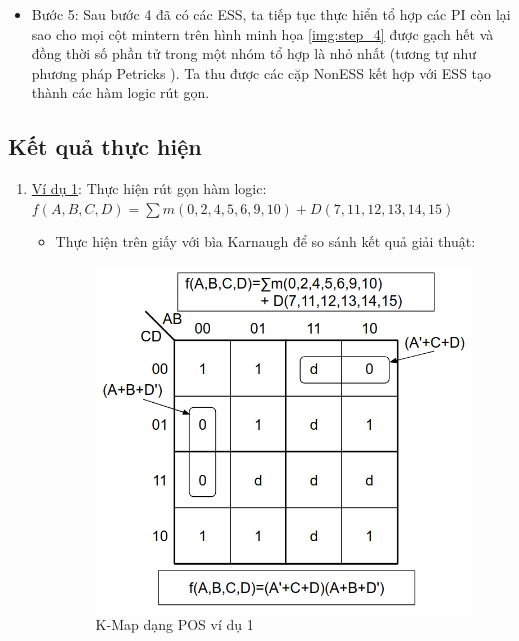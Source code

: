 \documentclass[titlepage]{article} %
\begin{document}
\begin{itemize}
    \item Bước 5: Sau bước 4 đã có các ESS, ta tiếp tục thực hiển tổ hợp các PI còn lại sao cho mọi cột mintern trên hình minh họa \ref{img:step_4} được gạch hết và đồng thời số phần tử trong một nhóm tổ hợp là nhỏ nhất (tương tự như phương pháp Petricks \cite{Petrick:2020}). Ta thu được các cặp NonESS kết hợp với ESS tạo thành các hàm logic rút gọn.
    
    
\end{itemize}


\subsection{Kết quả thực hiện}
\begin{enumerate}
    \item \underline{Ví dụ 1}: Thực hiện rút gọn hàm logic: \\   
    $f(A,B,C,D) = \sum m(0,2,4,5,6,9,10) + D(7,11,12,13,14,15)$
    \begin{itemize} 
        \item Thực hiện trên giấy với bìa Karnaugh \cite{KMap:2020} để so sánh kết quả giải thuật:
        \begin{figure}[!h]
        \begin{minipage}[t]{0.5\linewidth}
            \centering
            \includegraphics[width=.9\textwidth]{kmap_maxtern_1.png}
            \caption[K-Map dạng POS ví dụ 1]{\centering K-Map dạng POS ví dụ 1}
            \label{img:kmap_maxtern_1}
        \end{minipage}

\end{figure}
\end{itemize}
\end{enumerate}
\end{document}
